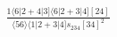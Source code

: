 \documentclass[varwidth, border=5pt]{standalone}
\begin{document}
\begin{my}
$\begin{gathered}
\scriptscriptstyle\frac{1⟨6|2+4|3]⟨6|2+3|4][24]}{⟨56⟩⟨1|2+3|4]s_{234}[34]^2}
\end{gathered}$
\end{my}
\end{document}
